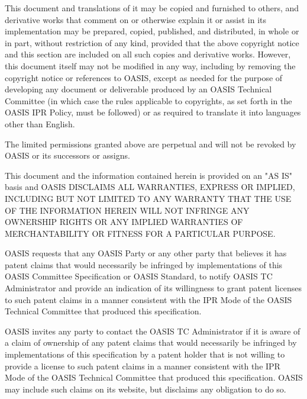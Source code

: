 \begin{titlepage}
This document and translations of it may be copied and furnished to
others, and derivative works that comment on or otherwise explain it
or assist in its implementation may be prepared, copied, published,
and distributed, in whole or in part, without restriction of any kind,
provided that the above copyright notice and this section are included
on all such copies and derivative works. However, this document itself
may not be modified in any way, including by removing the copyright
notice or references to OASIS, except as needed for the purpose of
developing any document or deliverable produced by an OASIS Technical
Committee (in which case the rules applicable to copyrights, as set
forth in the OASIS IPR Policy, must be followed) or as required to
translate it into languages other than English.

The limited permissions granted above are perpetual and will not be
revoked by OASIS or its successors or assigns.

This document and the information contained herein is provided on an
"AS IS" basis and OASIS DISCLAIMS ALL WARRANTIES, EXPRESS OR IMPLIED,
INCLUDING BUT NOT LIMITED TO ANY WARRANTY THAT THE USE OF THE
INFORMATION HEREIN WILL NOT INFRINGE ANY OWNERSHIP RIGHTS OR ANY
IMPLIED WARRANTIES OF MERCHANTABILITY OR FITNESS FOR A PARTICULAR
PURPOSE.

OASIS requests that any OASIS Party or any other party that believes
it has patent claims that would necessarily be infringed by
implementations of this OASIS Committee Specification or OASIS
Standard, to notify OASIS TC Administrator and provide an indication
of its willingness to grant patent licenses to such patent claims in a
manner consistent with the IPR Mode of the OASIS Technical Committee
that produced this specification.

OASIS invites any party to contact the OASIS TC Administrator if it is
aware of a claim of ownership of any patent claims that would
necessarily be infringed by implementations of this specification by a
patent holder that is not willing to provide a license to such patent
claims in a manner consistent with the IPR Mode of the OASIS Technical
Committee that produced this specification. OASIS may include such
claims on its website, but disclaims any obligation to do so.


\end{titlepage}
